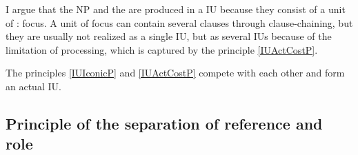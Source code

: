I argue that the NP and the  are produced in a  IU
because they consist of a unit of : focus.
A unit of focus can contain several clauses through clause-chaining,
but they are usually not realized as a single IU, but as several IUs
because of the limitation of processing,
which is captured by the principle \ref{IUActCostP}.

The principles \ref{IUIconicP} and \ref{IUActCostP} compete with each other and form an actual IU.



\subsection{Principle of the separation of reference and role}

%
%
%
%

